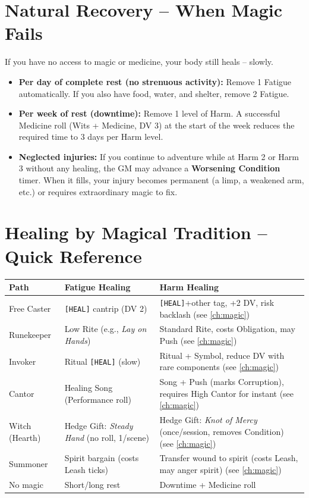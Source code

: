 \section{Natural Recovery -- When Magic Fails}
\label{sec:natural-recovery}

If you have no access to magic or medicine, your body still heals -- slowly.

\begin{itemize}
  \item \textbf{Per day of complete rest (no strenuous activity):} Remove 1 Fatigue automatically. If you also have food, water, and shelter, remove 2 Fatigue.
  \item \textbf{Per week of rest (downtime):} Remove 1 level of Harm. A successful Medicine roll (Wits + Medicine, DV 3) at the start of the week reduces the required time to 3 days per Harm level.
  \item \textbf{Neglected injuries:} If you continue to adventure while at Harm 2 or Harm 3 without any healing, the GM may advance a \textbf{Worsening Condition} timer. When it fills, your injury becomes permanent (a limp, a weakened arm, etc.) or requires extraordinary magic to fix.
\end{itemize}

\section{Healing by Magical Tradition -- Quick Reference}
\label{sec:healing-by-tradition}

\begin{table}[h]
\centering
\small
\renewcommand{\arraystretch}{1.3}
\begin{tabular}{l l X}
\toprule
\textbf{Path} & \textbf{Fatigue Healing} & \textbf{Harm Healing} \\
\midrule
Free Caster & \texttt{[HEAL]} cantrip (DV 2) & \texttt{[HEAL]}+other tag, +2 DV, risk backlash (see \ref{ch:magic}) \\
Runekeeper & Low Rite (e.g., \textit{Lay on Hands}) & Standard Rite, costs Obligation, may Push (see \ref{ch:magic}) \\
Invoker & Ritual \texttt{[HEAL]} (slow) & Ritual + Symbol, reduce DV with rare components (see \ref{ch:magic}) \\
Cantor & Healing Song (Performance roll) & Song + Push (marks Corruption), requires High Cantor for instant (see \ref{ch:magic}) \\
Witch (Hearth) & Hedge Gift: \textit{Steady Hand} (no roll, 1/scene) & Hedge Gift: \textit{Knot of Mercy} (once/session, removes Condition) (see \ref{ch:magic}) \\
Summoner & Spirit bargain (costs Leash ticks) & Transfer wound to spirit (costs Leash, may anger spirit) (see \ref{ch:magic}) \\
No magic & Short/long rest & Downtime + Medicine roll \\
\bottomrule
\end{tabular}
\end{table}


